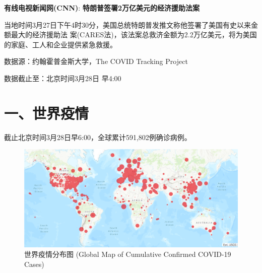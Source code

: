 \documentclass[]{article}
\begin{document}
\textbf{\textcolor{glaucous}{有线电视新闻网(CNN)}}:
\textbf{特朗普签署2万亿美元的经济援助法案}

当地时间3月27日下午4时30分，美国总统特朗普发推文称他签署了美国有史以来金额最大的经济援助法
案(CARES法)，该法案总救济金额为2.2万亿美元，将为美国的家庭、工人和企业提供紧急救援。

\newpage

%
  \noindent{}%

数据源：约翰霍普金斯大学，The COVID Tracking Project

数据截止至：北京时间3月28日 早4:00

\hypertarget{section-2}{%
\section{\texorpdfstring{\textcolor{glaucous}{一、世界疫情}}{}}\label{section-2}}

截止北京时间3月28日早6:00，全球累计591,802例确诊病例。

\begin{figure}[H] 
\centering
\includegraphics[]{./input/table_plot/covid1.png} %
\caption{世界疫情分布图 (Global Map of Cumulative Confirmed COVID-19 Cases)} %
\label{} %
\end{figure}
\end{document}
